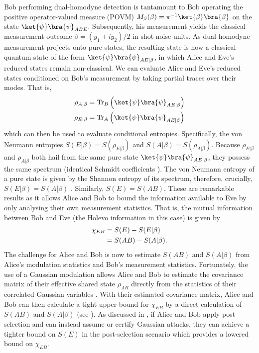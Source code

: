 ﻿\documentclass[12pt]{article}
\begin{document}
Bob performing dual-homodyne detection is tantamount to Bob operating the positive operator-valued measure (POVM) $M_\beta(\beta) = \pi^{-1}\ket{\beta}\bra{\beta}$ on the state $\ket{\psi}\bra{\psi}_{ABE}$. Subsequently, his measurement yields the classical measurement outcome $\beta = (y_1 + i y_2)/2$ in shot-noise units. As dual-homodyne measurement projects onto pure states, the resulting state is now a classical-quantum state of the form $\ket{\psi}\bra{\psi}_{AE|\beta}$, in which Alice and Eve's reduced states remain non-classical. We can evaluate Alice and Eve's reduced states conditioned on Bob's measurement by taking partial traces over their modes. That is,
\begin{align}
  \rho_{A|\beta} &= \text{Tr}_B\left(\ket{\psi}\bra{\psi}_{AE|\beta}\right) \\
  \rho_{E|\beta} &= \text{Tr}_A\left(\ket{\psi}\bra{\psi}_{AE|\beta}\right) 
\end{align}
which can then be used to evaluate conditional entropies. Specifically, the von Neumann entropies $S(E|\beta) = S(\rho_{E|\beta})$ and $S(A|\beta) = S(\rho_{A|\beta})$. Because $\rho_{E|\beta}$ and $\rho_{A|\beta}$ both hail from the same pure state $\ket{\psi}\bra{\psi}_{AE|\beta}$, they possess the same spectrum (identical Schmidt coefficients \cite{Nielsen-2010, Laudenbach-2018}). The von Neumann entropy of a pure state is given by the Shannon entropy of its spectrum, therefore, crucially, $S(E|\beta) = S(A|\beta)$ \cite{Nielsen-2010}. Similarly, $S(E) = S(AB)$. These are remarkable results as it allows Alice and Bob to bound the information available to Eve by only analysing their own measurement statistics. That is, the mutual information between Bob and Eve (the Holevo information in this case) is given by
\begin{align} \label{eq: chi}
  \chi_{EB} &= S(E) - S(E|\beta) \\
  &= S(AB) - S(A|\beta). \notag
\end{align}
The challenge for Alice and Bob is now to estimate $S(AB)$ and $S(A|\beta)$ from Alice's modulation statistics and Bob's measurement statistics. Fortunately, the use of a Gaussian modulation allows Alice and Bob to estimate the covariance matrix of their effective shared state $\rho_{AB}$ directly from the statistics of their correlated Gaussian variables \cite{Grosshans-2003, Laudenbach-2018}. With their estimated covariance matrix, Alice and Bob can then calculate a tight upper-bound for $\chi_{EB}$ by a direct calculation of $S(AB)$ and $S(A|\beta)$ (see ). As discussed in , if Alice and Bob apply post-selection and can instead assume or certify Gaussian attacks, they can achieve a tighter bound on $S(E)$ in the post-selection scenario which provides a lowered bound on $\chi_{EB}$.
\end{document}
